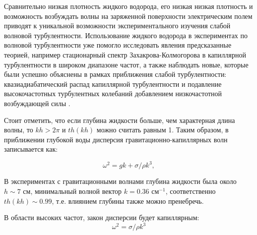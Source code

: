Сравнительно низкая плотность жидкого водорода, его низкая низкая плотность и возможность возбуждать волны на заряженной поверхности электрическим полем приводят к уникальной возможности экспериментального изучения слабой волновой турбулентности. Использование жидкого водорода в экспериментах по волновой турбулентности уже помогло исследовать явления предсказанные теорией, например стационарный  спектр Захакрова-Колмогорова в капиллярной турбулентности в широком диапазоне частот, а также наблюдать новые, которые были успешно объяснены в рамках  приближения слабой турбулентности: квазиадиабатический распад капиллярной турбулентности \cite{quasiadiabatic} и подавление высокочастотных турбулентных колебаний добавлением низкочастотной возбуждающей силы \cite{addLowFreq}.

Стоит отметить, что если глубина жидкости больше, чем характерная длина волны, то $kh > 2\pi$ и $th(kh)$ можно считать равным 1. Таким образом, в приближении глубокой воды дисперсия гравитационно-капиллярных волн записывается как:


\begin{equation}
 \label{eq:disper}
\omega^2 = gk + \sigma/\rho k^3,
\end{equation}


В экспериментах с гравитационными волнами глубина жидкости была около $ h \sim 7$ см, минимальный волной вектор $k = 0.36$ см$^{-1}$, соответственно $th(kh) \sim 0.99$, т.е. влиянием глубины также можно пренебречь.


В области высоких частот, закон дисперсии будет капиллярным:
\begin{equation}
 \label{eq:disperCap}
\omega^2 = \sigma/\rho k^3
\end{equation}


